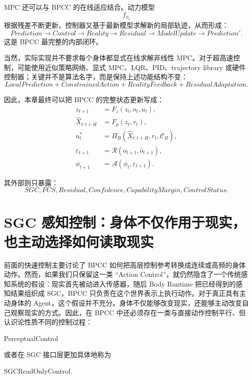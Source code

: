 MPC 还可以与 BPCC 的在线适应结合。动力模型
\[
f_{\phi_t}
\]
根据残差不断更新，控制器又基于最新模型求解新的局部轨迹，从而形成：
\[
Prediction
\rightarrow
Control
\rightarrow
Reality
\rightarrow
Residual
\rightarrow
ModelUpdate
\rightarrow
Prediction'.
\]
这是 BPCC 最完整的内部闭环。

当然，实际实现并不要求每个身体都显式在线求解非线性 MPC。对于超高速控制，可能使用近似策略网络、显式 MPC、LQR、PID、trajectory library 或硬件控制器；关键并不是算法名字，而是保持上述功能结构不变：
\[
\boxed{
LocalPrediction
+
ConstrainedAction
+
RealityFeedback
+
ResidualAdaptation.
}
\]

因此，本章最终可以把 BPCC 的完整状态更新写成：
\[
\boxed{
\begin{aligned}
z_{t+1}
&=
F_z(
z_t,o_t,u_t
),\\
\hat X_{t:t+H}
&=
F_p(
z_t,r_t
),\\
u_t^\ast
&=
\Pi_B(
\hat X_{t:t+H},
r_t,
\mathcal C_B
),\\
\varepsilon_{t+1}
&=
\mathcal R(
o_{t+1},
\hat o_{t+1}
),\\
\phi_{t+1}
&=
\mathcal A(
\phi_t,
\varepsilon_{t+1}
).
\end{aligned}
}
\]

其外部则只暴露：
\[
\boxed{
SGC,
FCS,
Residual,
Confidence,
CapabilityMargin,
ControlStatus.
}
\]



\section{SGC 感知控制：身体不仅作用于现实，也主动选择如何读取现实}

前面的快速控制主要讨论了 BPCC 如何把高层控制参考转换成连续或高频的身体动作。然而，如果我们只保留这一类 ``Action Control''，就仍然隐含了一个传统感知系统的假设：现实首先被动进入传感器，随后 Body Runtime 把已经得到的感知结果组织成 SGC，BPCC 只负责在这个世界表示上执行动作。对于真正具有主动身体的 Agent，这个假设并不充分。身体不仅能够改变现实，还能够主动改变自己观察现实的方式。因此，在 BPCC 中还必须存在一类与直接动作控制平行、但认识论性质不同的控制过程：

\begin{statementbox}
PerceptualControl
\end{statementbox}

或者在 SGC 接口层更加具体地称为

\begin{statementbox}
SGCReadOnlyControl.
\end{statementbox}

